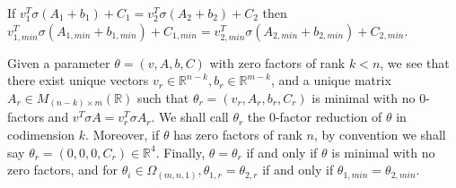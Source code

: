 \documentclass[11pt,letterpaper]{amsart}
\begin{document}
\begin{lemma}\label{lem:minred}
    If $v_1^T\sigma (A_1+b_1) + C_1 = v^T_2\sigma (A_2+b_2) + C_2$ then 
    $v_{1, min}^T\sigma (A_{1, min}+b_{1, min}) + C_{1, min} = v^T_{2, min}\sigma (A_{2, min}+b_{2, min}) + C_{2, min}$.
\end{lemma}
\begin{definlem}\label{deflem:reduced}
    Given a parameter $\theta=(v, A, b, C)$ with zero factors of rank $k<n$, we see that there exist unique vectors $v_{r}\in \mathbb{R}^{n-k}, b_r\in\mathbb{R}^{m-k}$, and a unique matrix $A_r\in M_{(n-k)\times m}(\mathbb{R})$ such that $\theta_r=(v_r, A_r, b_r, C_r)$ is minimal with no 0-factors and $v^T\sigma A = v_r^T\sigma A_r$. We shall call $\theta_r$ the 0-factor reduction of $\theta$ in codimension $k$. Moreover, if $\theta$ has zero factors of rank $n$, by convention we shall say $\theta_r = (0, 0, 0, C_r)\in \mathbb{R}^4$. Finally, $\theta=\theta_r$ if and only if $\theta$ is minimal with no zero factors, and for $\theta_i\in\Omega_{(m,n,1)}, \theta_{1, r}=\theta_{2,r}$ if and only if $\theta_{1, min}=\theta_{2, min}$. 
\end{definlem}
\end{document}
